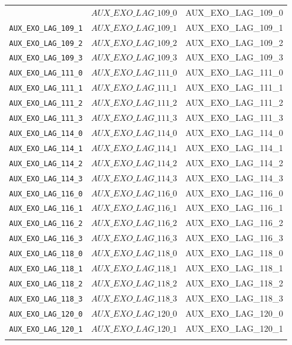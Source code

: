 \begin{center}
\begin{longtable}{ccc}
{\texttt{AUX\_EXO\_LAG\_109\_0} & $AUX\_EXO\_LAG\_109\_0$ & AUX\_EXO\_LAG\_109\_0\\
\texttt{AUX\_EXO\_LAG\_109\_1} & $AUX\_EXO\_LAG\_109\_1$ & AUX\_EXO\_LAG\_109\_1\\
\texttt{AUX\_EXO\_LAG\_109\_2} & $AUX\_EXO\_LAG\_109\_2$ & AUX\_EXO\_LAG\_109\_2\\
\texttt{AUX\_EXO\_LAG\_109\_3} & $AUX\_EXO\_LAG\_109\_3$ & AUX\_EXO\_LAG\_109\_3\\
\texttt{AUX\_EXO\_LAG\_111\_0} & $AUX\_EXO\_LAG\_111\_0$ & AUX\_EXO\_LAG\_111\_0\\
\texttt{AUX\_EXO\_LAG\_111\_1} & $AUX\_EXO\_LAG\_111\_1$ & AUX\_EXO\_LAG\_111\_1\\
\texttt{AUX\_EXO\_LAG\_111\_2} & $AUX\_EXO\_LAG\_111\_2$ & AUX\_EXO\_LAG\_111\_2\\
\texttt{AUX\_EXO\_LAG\_111\_3} & $AUX\_EXO\_LAG\_111\_3$ & AUX\_EXO\_LAG\_111\_3\\
\texttt{AUX\_EXO\_LAG\_114\_0} & $AUX\_EXO\_LAG\_114\_0$ & AUX\_EXO\_LAG\_114\_0\\
\texttt{AUX\_EXO\_LAG\_114\_1} & $AUX\_EXO\_LAG\_114\_1$ & AUX\_EXO\_LAG\_114\_1\\
\texttt{AUX\_EXO\_LAG\_114\_2} & $AUX\_EXO\_LAG\_114\_2$ & AUX\_EXO\_LAG\_114\_2\\
\texttt{AUX\_EXO\_LAG\_114\_3} & $AUX\_EXO\_LAG\_114\_3$ & AUX\_EXO\_LAG\_114\_3\\
\texttt{AUX\_EXO\_LAG\_116\_0} & $AUX\_EXO\_LAG\_116\_0$ & AUX\_EXO\_LAG\_116\_0\\
\texttt{AUX\_EXO\_LAG\_116\_1} & $AUX\_EXO\_LAG\_116\_1$ & AUX\_EXO\_LAG\_116\_1\\
\texttt{AUX\_EXO\_LAG\_116\_2} & $AUX\_EXO\_LAG\_116\_2$ & AUX\_EXO\_LAG\_116\_2\\
\texttt{AUX\_EXO\_LAG\_116\_3} & $AUX\_EXO\_LAG\_116\_3$ & AUX\_EXO\_LAG\_116\_3\\
\texttt{AUX\_EXO\_LAG\_118\_0} & $AUX\_EXO\_LAG\_118\_0$ & AUX\_EXO\_LAG\_118\_0\\
\texttt{AUX\_EXO\_LAG\_118\_1} & $AUX\_EXO\_LAG\_118\_1$ & AUX\_EXO\_LAG\_118\_1\\
\texttt{AUX\_EXO\_LAG\_118\_2} & $AUX\_EXO\_LAG\_118\_2$ & AUX\_EXO\_LAG\_118\_2\\
\texttt{AUX\_EXO\_LAG\_118\_3} & $AUX\_EXO\_LAG\_118\_3$ & AUX\_EXO\_LAG\_118\_3\\
\texttt{AUX\_EXO\_LAG\_120\_0} & $AUX\_EXO\_LAG\_120\_0$ & AUX\_EXO\_LAG\_120\_0\\
\texttt{AUX\_EXO\_LAG\_120\_1} & $AUX\_EXO\_LAG\_120\_1$ & AUX\_EXO\_LAG\_120\_1\\
}
\end{longtable}
\end{center}
